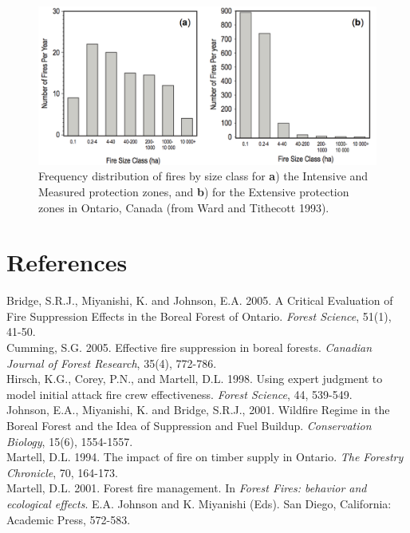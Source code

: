 \documentclass{article}
\begin{document}
\begin{spacing}{1.5}
\begin{figure}[h!]
  \centering
    \includegraphics[width=1\textwidth]{fig1}
      \caption{Frequency distribution of fires by size class for {\bf a}) the Intensive and Measured protection zones, and {\bf b}) for the Extensive protection zones in Ontario, Canada (from Ward and Tithecott 1993).}
\end{figure}

\end{spacing}
\clearpage
\section*{References}
\phantom
\noindent Bridge, S.R.J., Miyanishi, K. and Johnson, E.A. 2005. A Critical Evaluation of Fire Suppression Effects in the Boreal Forest of Ontario. {\it Forest Science}, 51(1), 41-50.\\

\noindent Cumming, S.G. 2005. Effective fire suppression in boreal forests. {\it Canadian Journal of Forest Research}, 35(4), 772-786.\\ 

\noindent Hirsch, K.G., Corey, P.N., and Martell, D.L. 1998. Using expert judgment to model initial attack fire crew effectiveness. {\it Forest Science}, 44, 539-549.\\

\noindent Johnson, E.A., Miyanishi, K. and Bridge, S.R.J., 2001. Wildfire Regime in the Boreal Forest and the Idea of Suppression and Fuel Buildup. {\it Conservation Biology}, 15(6), 1554-1557.\\

\noindent Martell, D.L. 1994. The impact of fire on timber supply in Ontario. {\it The Forestry Chronicle}, 70, 164-173.\\

\noindent Martell, D.L. 2001. Forest fire management. In {\it Forest Fires: behavior and ecological effects}. E.A. Johnson and K. Miyanishi (Eds). San Diego, California: Academic Press, 572-583.\\
\end{document}
